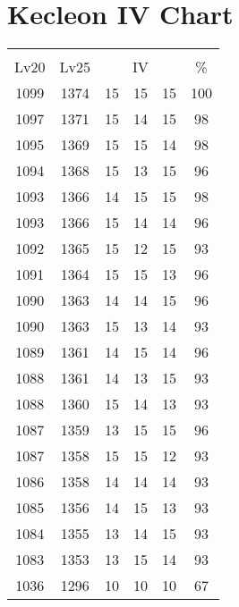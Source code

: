\documentclass{article}%
\begin{document}
%
\normalsize%
\section{Kecleon IV Chart}%
\label{sec:Kecleon IV Chart}%
\renewcommand{\arraystretch}{1.5}%
\begin{tabular}{|c|c|c|c|c|c|}%
\hline%
\multicolumn{6}{|c|}{\textcolor{white}{ 
\linebreak{Kecleon}
}%
\cellcolor{black}}\\%
\multicolumn{1}{|c}{Lv20}&\multicolumn{1}{c|}{Lv25}&\multicolumn{3}{c|}{IV}&\multicolumn{1}{|c|}{\%}\\%
\hline%
\rowcolor{color100}%
1099&1374&15&15&15&100\\%
\hline%
\rowcolor{color98}%
1097&1371&15&14&15&98\\%
\hline%
\rowcolor{color98}%
1095&1369&15&15&14&98\\%
\hline%
\rowcolor{color96}%
1094&1368&15&13&15&96\\%
\hline%
\rowcolor{color98}%
1093&1366&14&15&15&98\\%
\hline%
\rowcolor{color96}%
1093&1366&15&14&14&96\\%
\hline%
\rowcolor{color93}%
1092&1365&15&12&15&93\\%
\hline%
\rowcolor{color96}%
1091&1364&15&15&13&96\\%
\hline%
\rowcolor{color96}%
1090&1363&14&14&15&96\\%
\hline%
\rowcolor{color93}%
1090&1363&15&13&14&93\\%
\hline%
\rowcolor{color96}%
1089&1361&14&15&14&96\\%
\hline%
\rowcolor{color93}%
1088&1361&14&13&15&93\\%
\hline%
\rowcolor{color93}%
1088&1360&15&14&13&93\\%
\hline%
\rowcolor{color96}%
1087&1359&13&15&15&96\\%
\hline%
\rowcolor{color93}%
1087&1358&15&15&12&93\\%
\hline%
\rowcolor{color93}%
1086&1358&14&14&14&93\\%
\hline%
\rowcolor{color93}%
1085&1356&14&15&13&93\\%
\hline%
\rowcolor{color93}%
1084&1355&13&14&15&93\\%
\hline%
\rowcolor{color93}%
1083&1353&13&15&14&93\\%
\hline%
\rowcolor{color91}%
1036&1296&10&10&10&67\\%
\end{tabular}

%
\end{document}
